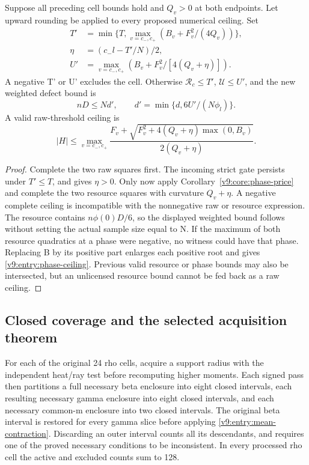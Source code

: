 \begin{lemma}\label{v9:entry:signed-step}
Suppose all preceding cell bounds hold and $Q_v>0$ at both endpoints.
Let upward rounding be applied to every proposed numerical ceiling.
Set
\begin{align*}
 T'&=\min\{T,\max_{v=c_-,c_+}(B_v+F_v^2/(4Q_v))\},\\
 \eta&=(c_-l-T'/N)/2,\\
 U'&=\max_{v=c_-,c_+}(B_v+F_v^2/[4(Q_v+\eta)]).
\end{align*}
A negative T' or U' excludes the cell. Otherwise $\mathcal R_c\le T'$,
$\mathcal U\le U'$, and the new weighted defect bound is
\[
 nD\le N d',\qquad d'=\min\{d,6U'/(N\phi_l)\}.
\]
A valid raw-threshold ceiling is
\begin{equation}\label{v9:entry:phase-ceiling}
 |H|\le\max_{v=c_-,c_+}
 \frac{F_v+\sqrt{F_v^2+4(Q_v+\eta)\max(0,B_v)}}{2(Q_v+\eta)}.
\end{equation}
\end{lemma}
\begin{proof}
Complete the two raw squares first. The incoming strict gate persists
under $T'\le T$, and gives $\eta>0$. Only now apply
Corollary~\ref{v9:core:phase-price} and complete the two resource
squares with curvature $Q_v+\eta$. A negative complete ceiling is
incompatible with the nonnegative raw or resource expression.
The resource contains $n\phi(0)D/6$, so the displayed weighted bound
follows without setting the actual sample size equal to N. If the
maximum of both resource quadratics at a phase were negative, no
witness could have that phase. Replacing B by its positive part enlarges
each positive root and gives \eqref{v9:entry:phase-ceiling}.
Previous valid resource or phase bounds may also be intersected, but
an unlicensed resource bound cannot be fed back as a raw ceiling.
\end{proof}

\subsection{Closed coverage and the selected acquisition theorem}
\label{v9:entry:selected-route}
For each of the original 24 rho cells, acquire a support radius with
the independent heat/ray test before recomputing higher moments.
Each signed pass then partitions a full necessary beta enclosure into
eight closed intervals, each resulting necessary gamma enclosure into
eight closed intervals, and each necessary common-m enclosure into two
closed intervals. The original beta interval is restored for every
gamma slice before applying \eqref{v9:entry:mean-contraction}.
Discarding an outer interval counts all its descendants, and requires
one of the proved necessary conditions to be inconsistent. In every
processed rho cell the active and excluded counts sum to 128.

